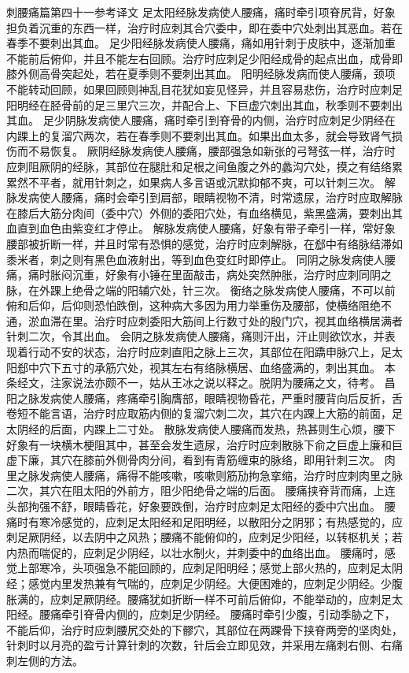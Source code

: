 \documentclass[12pt,UTF8]{ctexbook}
\begin{document}
刺腰痛篇第四十一参考译文
足太阳经脉发病使人腰痛，痛时牵引项脊尻背，好象担负着沉重的东西一样，治疗时应刺其合穴委中，即在委中穴处刺出其恶血。若在春季不要刺出其血。
足少阳经脉发病使人腰痛，痛如用针刺于皮肤中，逐渐加重不能前后俯仰，并且不能左右回顾。治疗时应刺足少阳经成骨的起点出血，成骨即膝外侧高骨突起处，若在夏季则不要刺出其血。
阳明经脉发病而使人腰痛，颈项不能转动回顾，如果回顾则神乱目花犹如妄见怪异，并且容易悲伤，治疗时应刺足阳明经在胫骨前的足三里穴三次，并配合上、下巨虚穴刺出其血，秋季则不要刺出其血。
足少阴脉发病使人腰痛，痛时牵引到脊骨的内侧，治疗时应刺足少阴经在内踝上的复溜穴两次，若在春季则不要刺出其血。如果出血太多，就会导致肾气损伤而不易恢复。
厥阴经脉发病使人腰痛，腰部强急如新张的弓弩弦一样，治疗时应刺阻厥阴的经脉，其部位在腿肚和足根之间鱼腹之外的蠡沟穴处，摸之有结络累累然不平者，就用针刺之，如果病人多言语或沉默抑郁不爽，可以针刺三次。
解脉发病使人腰痛，痛时会牵引到肩部，眼睛视物不清，时常遗尿，治疗时应取解脉在膝后大筋分肉间（委中穴）外侧的委阳穴处，有血络横见，紫黑盛满，要刺出其血直到血色由紫变红才停止。
解脉发病使人腰痛，好象有带子牵引一样，常好象腰部被折断一样，并且时常有恐惧的感觉，治疗时应刺解脉，在郄中有络脉结滞如黍米者，刺之则有黑色血液射出，等到血色变红时即停止。
同阴之脉发病使人腰痛，痛时胀闷沉重，好象有小锤在里面敲击，病处突然肿胀，治疗时应刺同阴之脉，在外踝上绝骨之端的阳辅穴处，针三次。
衡络之脉发病使人腰痛，不可以前俯和后仰，后仰则恐怕跌倒，这种病大多因为用力举重伤及腰部，使横络阻绝不通，淤血滞在里。治疗时应刺委阳大筋间上行数寸处的殷门穴，视其血络横居满者针刺二次，令其出血。
会阴之脉发病使人腰痛，痛则汗出，汗止则欲饮水，并表现着行动不安的状态，治疗时应刺直阳之脉上三次，其部位在阳蹻申脉穴上，足太阳郄中穴下五寸的承筋穴处，视其左右有络脉横居、血络盛满的，刺出其血。
本条经文，注家说法亦颇不一，姑从王冰之说以释之。脱阴为腰痛之文，待考。
昌阳之脉发病使人腰痛，疼痛牵引胸膺部，眼睛视物昏花，严重时腰背向后反折，舌卷短不能言语，治疗时应取筋内侧的复溜穴刺二次，其穴在内踝上大筋的前面，足太阴经的后面，内踝上二寸处。
散脉发病使人腰痛而发热，热甚则生心烦，腰下好象有一块横木梗阻其中，甚至会发生遗尿，治疗时应刺散脉下俞之巨虚上廉和巨虚下廉，其穴在膝前外侧骨肉分间，看到有青筋缠束的脉络，即用针刺三次。
肉里之脉发病使人腰痛，痛得不能咳嗽，咳嗽则筋劢拘急挛缩，治疗时应刺肉里之脉二次，其穴在阻太阳的外前方，阻少阳绝骨之端的后面。
腰痛挟脊背而痛，上连头部拘强不舒，眼睛昏花，好象要跌倒，治疗时应刺足太阳经的委中穴出血。
腰痛时有寒冷感觉的，应刺足太阳经和足阳明经，以散阳分之阴邪；有热感觉的，应刺足厥阴经，以去阴中之风热；腰痛不能俯仰的，应刺足少阳经，以转枢机关；若内热而喘促的，应刺足少阴经，以壮水制火，并刺委中的血络出血。
腰痛时，感觉上部寒冷，头项强急不能回顾的，应刺足阳明经；感觉上部火热的，应刺足太阴经；感觉内里发热兼有气喘的，应刺足少阴经。大便困难的，应刺足少阴经。少腹胀满的，应刺足厥阴经。腰痛犹如折断一样不可前后俯仰，不能举动的，应刺足太阳经。腰痛牵引脊骨内侧的，应刺足少阴经。
腰痛时牵引少腹，引动季胁之下，不能后仰，治疗时应刺腰尻交处的下髎穴，其部位在两踝骨下挟脊两旁的坚肉处，针刺时以月亮的盈亏计算针刺的次数，针后会立即见效，并采用左痛刺右侧、右痛刺左侧的方法。
\end{document}
